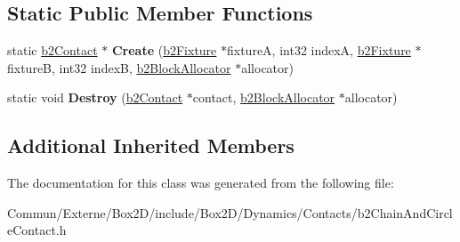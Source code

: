 \subsection*{Static Public Member Functions}
\begin{DoxyCompactItemize}
\item 
static \hyperlink{classb2_contact}{b2\+Contact} $\ast$ {\bfseries Create} (\hyperlink{classb2_fixture}{b2\+Fixture} $\ast$fixtureA, int32 indexA, \hyperlink{classb2_fixture}{b2\+Fixture} $\ast$fixtureB, int32 indexB, \hyperlink{classb2_block_allocator}{b2\+Block\+Allocator} $\ast$allocator)\hypertarget{classb2_chain_and_circle_contact_a644e6d00b903534b5b00e76c52859ad8}{}\label{classb2_chain_and_circle_contact_a644e6d00b903534b5b00e76c52859ad8}

\item 
static void {\bfseries Destroy} (\hyperlink{classb2_contact}{b2\+Contact} $\ast$contact, \hyperlink{classb2_block_allocator}{b2\+Block\+Allocator} $\ast$allocator)\hypertarget{classb2_chain_and_circle_contact_abe4320581520cd75b333200745f436b8}{}\label{classb2_chain_and_circle_contact_abe4320581520cd75b333200745f436b8}

\end{DoxyCompactItemize}
\subsection*{Additional Inherited Members}


The documentation for this class was generated from the following file\+:\begin{DoxyCompactItemize}
\item 
Commun/\+Externe/\+Box2\+D/include/\+Box2\+D/\+Dynamics/\+Contacts/b2\+Chain\+And\+Circle\+Contact.\+h\end{DoxyCompactItemize}
